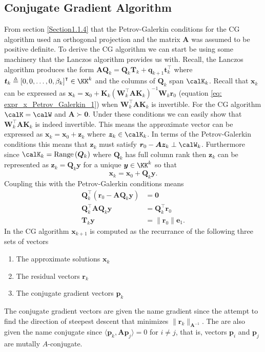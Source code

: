 \subsection{Conjugate Gradient Algorithm}\label{Section4.5}

From section \ref{Section1.1.4} that the Petrov-Galerkin conditions for the CG algorithm used an orthogonal projection and the matrix $\bm{A}$ was assumed to be positive definite. To derive the CG algorithm we can start be using some machinery that the Lanczos algorithm provides us with. Recall, the Lanczos algorithm produces the form $\bm{A}\bm{Q}_k = \bm{Q}_k \bm{T}_k + \bm{q}_{k+1} \bm{t}_{k}^{\intercal}$ where $\bm{t}_{k} \triangleq \left[ 0,0, \ldots , 0, \beta_k \right]^{\intercal} \in \KK^k$ and the columns of $\bm{Q}_k$ span $\calK_k$. Recall that $\bm{x}_k$ can be expressed as $\bm{x}_k = \bm{x}_0 + \bm{K}_k \left( \bm{W}_k^{\intercal} \bm{A} \bm{K}_k \right)^{-1} \bm{W}_k \bm{r}_0$ (equation \ref{eq: expr_x_Petrov_Galerkin_1}) when $\bm{W}_k^{\intercal} \bm{A} \bm{K}_k$ is invertible. For the CG algorithm $\calK = \calW$ and $\bm{A} \succ \bm{0}$. Under these conditions we can easily show that $\bm{W}_k^{\intercal} \bm{A} \bm{K}_k$ is indeed invertible. This means the approximate vector can be expressed as $\bm{x}_k = \bm{x}_0 + \bm{z}_k$ where $\bm{z}_k \in \calK_k$. In terms of the Petrov-Galerkin conditions this means that $\bm{z}_k$ must satisfy $\bm{r}_0 - \bm{A} \bm{z}_k \perp \calW_k$. Furthermore since $\calK_k = \operatorname{Range} \left( \bm{Q}_k \right)$ where $\bm{Q}_k$ has full column rank then $\bm{z}_k$ can be represented as $\bm{z}_k = \bm{Q}_k \bm{y}$ for a unique $\bm{y} \in \KK^k$ so that
\begin{equation} \label{eq: x_eq_Qky}
    \bm{x}_k = \bm{x}_0 + \bm{Q}_k \bm{y}.
\end{equation}
Coupling this with the Petrov-Galerkin conditions means
\begin{align} \label{eq: Tky_eq_normr0e1}
    \bm{Q}_k^{\intercal} \left( \bm{r}_0 - \bm{A} \bm{Q}_k \bm{y} \right) & = \bm{0}                        \nonumber \\
    \bm{Q}_k^{\intercal} \bm{A} \bm{Q}_k \bm{y}                           & = \bm{Q}_k^{\intercal} \bm{r}_0 \nonumber \\
    \bm{T}_k \bm{y}                                                       & = \| \bm{r}_0 \| \bm{e}_1.
\end{align}
In the CG algorithm $\bm{x}_{k+1}$ is computed as the recurrance of the following three sets of vectors
\begin{enumerate}
    \item The approximate solutions $\bm{x}_{k}$
    \item The residual vectors $\bm{r}_{k}$
    \item The conjugate gradient vectors $\bm{p}_k$
\end{enumerate}
The conjugate gradient vectors are given the name gradient since the attempt to find the direction of steepest descent that minimizes $\| \bm{r}_{k} \|_{\bm{A}^{-1}}$. The are also given the name conjugate since $\langle \bm{p}_k, \bm{A} \bm{p}_j \rangle = 0$ for $i \neq j$, that is, vectors $\bm{p}_i$ and $\bm{p}_j$ are mutally $A$-conjugate.

